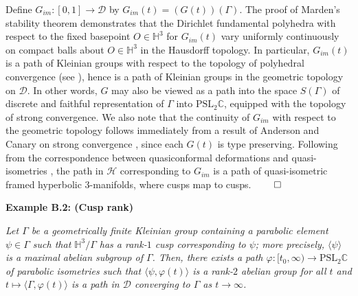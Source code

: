 \documentclass[11pt,leqno]{article}
\theoremstyle{introdef}
\numberwithin{lemma}{section}
\theoremstyle{definition}
\newcommand{\C}{\mathbb{C}}
\begin{document}
Define $G_{im}:[0,1]\rightarrow\mathcal{D}$ by $G_{im}(t)=(G(t))(\Gamma)$. The proof of Marden's stability theorem \cite{MAR} demonstrates that the Dirichlet fundamental polyhedra with respect to the fixed basepoint $O\in\mathbb{H}^3$ for $G_{im}(t)$ vary uniformly continuously on compact balls about $O\in\mathbb{H}^3$ in the Hausdorff topology. In particular, $G_{im}(t)$ is a path of Kleinian groups with respect to the topology of polyhedral convergence (see \cite{MAT}), hence is a path of Kleinian groups in the geometric topology on $\mathcal{D}$. In other words, $G$ may also be viewed as a path into the space $S(\Gamma)$ of discrete and faithful representation of $\Gamma$ into $\mathrm{PSL}_2\C$, equipped with the topology of strong convergence. We also note that the continuity of $G_{im}$ with respect to the geometric topology follows immediately from a result of Anderson and Canary on strong convergence \cite{ANCAN}, since each $G(t)$ is type preserving. Following from the correspondence between quasiconformal deformations and quasi-isometries \cite{RENORM}, the path in $\mathcal{H}$ corresponding to $G_{im}$ is a path of quasi-isometric framed hyperbolic $3$-manifolds, where cusps map to cusps. $\qed$

\vspace{0.1in}


\hypertarget{Ex-CuspRank}{\textbf{Example B.2: (Cusp rank)}} \textit{Let $\Gamma$ be a geometrically finite Kleinian group containing a parabolic element $\psi\in\Gamma$ such that $\mathbb{H}^3/\Gamma$ has a rank-$1$ cusp corresponding to $\psi$; more precisely, $\langle\psi\rangle$ is a maximal abelian subgroup of $\Gamma$. Then, there exists a path $\varphi:[t_0,\infty)\rightarrow\mathrm{PSL}_2\C$ of parabolic isometries such that $\langle\psi,\varphi(t)\rangle$ is a rank-$2$ abelian group for all $t$ and $t\mapsto\langle\Gamma,\varphi(t)\rangle$ is a path in $\mathcal{D}$ converging to $\Gamma$ as $t\rightarrow\infty$.}\par

\vspace{0.05in}
\end{document}

